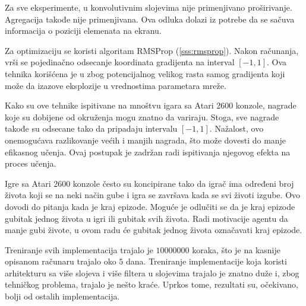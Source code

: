 \par 
Za sve eksperimente, u konvolutivnim slojevima nije primenjivano proširivanje. Agregacija takođe nije primenjivana. Ova odluka dolazi iz potrebe da se sačuva informacija o poziciji elemenata na ekranu.
\par 
Za optimizaciju se koristi algoritam RMSProp (\ref{sss:rmsprop}). Nakon računanja, vrši se pojedinačno odsecanje koordinata gradijenta na interval $[-1, 1]$. Ova tehnika korišćena je u \cite{dqn_dm} zbog potencijalnog velikog rasta samog gradijenta koji može da izazove eksplozije u vrednostima parametara mreže.
\par 
Kako su ove tehnike ispitivane na mnoštvu igara sa Atari 2600 konzole, nagrade koje su dobijene od okruženja mogu znatno da variraju. Stoga, sve nagrade takođe su odsecane tako da pripadaju intervalu $[-1, 1]$. Nažalost, ovo onemogućava razlikovanje većih i manjih nagrada, što može dovesti do manje efikasnog učenja. Ovaj postupak je zadržan radi ispitivanja njegovog efekta na proces učenja.
\par 
Igre sa Atari 2600 konzole često su koncipirane tako da igrač ima određeni broj života koji se na neki način gube i igra se završava kada se svi životi izgube. Ovo dovodi do pitanja kada je kraj epizode. Moguće je odlučiti se da je kraj epizode gubitak jednog života u igri ili gubitak svih života. Radi motivacije agentu da manje gubi živote, u ovom radu će gubitak jednog života označavati kraj epizode.
\par 
Treniranje svih implementacija trajalo je $10000000$ koraka, što je na kasnije opisanom računaru trajalo oko $5$ dana. Treniranje implementacije koja koristi arhitekturu sa više slojeva i više filtera u slojevima trajalo je znatno duže i, zbog tehničkog problema, trajalo je nešto kraće. Uprkos tome, rezultati su, očekivano, bolji od ostalih implementacija.
